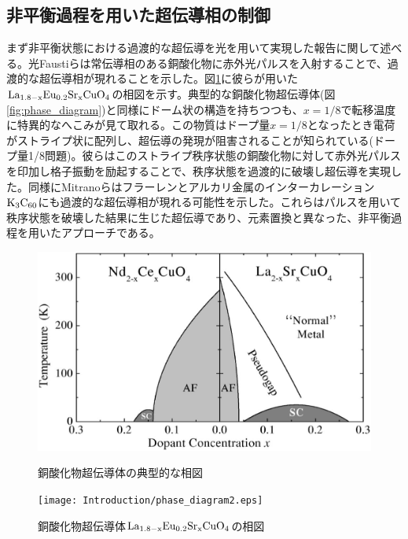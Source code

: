 \subsection{非平衡過程を用いた超伝導相の制御}
まず非平衡状態における過渡的な超伝導を光を用いて実現した報告に関して述べる。光Faustiらは常伝導相のある銅酸化物に赤外光パルスを入射することで、過渡的な超伝導相が現れることを示した\cite{Fausti,Hunt2015}。図\ref{fig:phase_diagram2}に彼らが用いた$\rm La_{1.8-x}Eu_{0.2}Sr_{x}CuO_4$の相図を示す\cite{Cavalleri2018}。典型的な銅酸化物超伝導体(図\ref{fig:phase_diagram})と同様にドーム状の構造を持ちつつも、$x=1/8$で転移温度に特異的なへこみが見て取れる。この物質はドープ量$x=1/8$となったとき電荷がストライプ状に配列し、超伝導の発現が阻害されることが知られている(ドープ量1/8問題)。彼らはこのストライプ秩序状態の銅酸化物に対して赤外光パルスを印加し格子振動を励起することで、秩序状態を過渡的に破壊し超伝導を実現した。同様にMitranoらはフラーレンとアルカリ金属のインターカレーション$\rm K_3C_{60}$にも過渡的な超伝導相が現れる可能性を示した\cite{Mitrano2016}。これらはパルスを用いて秩序状態を破壊した結果に生じた超伝導であり、元素置換と異なった、非平衡過程を用いたアプローチである。
\begin{figure}[!h]
 \begin{minipage}{0.55\hsize}
    \begin{center}
   \includegraphics[width=\hsize]{Introduction/phase_diagram.eps}
  \end{center}
  \caption{銅酸化物超伝導体の典型的な相図\cite{Andrea2003}}
  \label{fig:phase_diagram}
 \end{minipage}
 \begin{minipage}{0.45\hsize}
    \begin{center}
   \texttt{[image: Introduction/phase\_diagram2.eps]}
  \end{center}
  \caption{銅酸化物超伝導体$\rm La_{1.8-x}Eu_{0.2}Sr_{x}CuO_4$の相図\cite{Cavalleri2018}}
  \label{fig:phase_diagram2}
 \end{minipage}
\end{figure}

